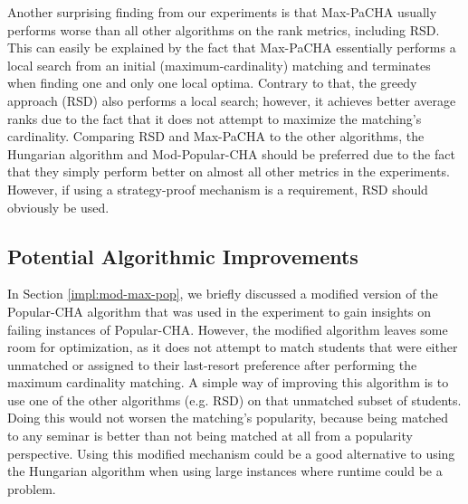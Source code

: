 Another surprising finding from our experiments is that Max-PaCHA usually performs worse than all other algorithms on the rank metrics, including RSD. This can easily be explained by the fact that Max-PaCHA essentially performs a local search from an initial (maximum-cardinality) matching and terminates when finding one and only one local optima. Contrary to that, the greedy approach (RSD) also performs a local search; however, it achieves better average ranks due to the fact that it does not attempt to maximize the matching's cardinality. Comparing RSD and Max-PaCHA to the other algorithms, the Hungarian algorithm and Mod-Popular-CHA should be preferred due to the fact that they simply perform better on almost all other metrics in the experiments. However, if using a strategy-proof mechanism is a requirement, RSD should obviously be used.

\subsection{Potential Algorithmic Improvements}\label{sec:improvements}
In Section \ref{impl:mod-max-pop}, we briefly discussed a modified version of the Popular-CHA algorithm that was used in the experiment to gain insights on failing instances of Popular-CHA. However, the modified algorithm leaves some room for optimization, as it does not attempt to match students that were either unmatched or assigned to their last-resort preference after performing the maximum cardinality matching. A simple way of improving this algorithm is to use one of the other algorithms (e.g. RSD) on that unmatched subset of students. Doing this would not worsen the matching's popularity, because being matched to any seminar is better than not being matched at all from a popularity perspective. Using this modified mechanism could be a good alternative to using the Hungarian algorithm when using large instances where runtime could be a problem. 

